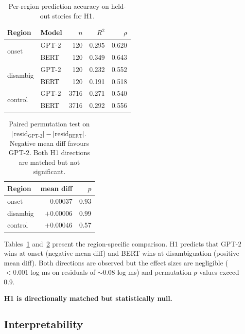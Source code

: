 \documentclass[11pt]{article}
\begin{document}
\begin{table}[t]
\centering
\small
\begin{tabular}{ll rrr}
\toprule
\textbf{Region} & \textbf{Model} & $n$ & $R^2$ & $\rho$ \\
\midrule
\multirow{2}{*}{onset}   & GPT-2 & 120 & 0.295 & 0.620 \\
                          & BERT  & 120 & 0.349 & 0.643 \\
\midrule
\multirow{2}{*}{disambig}& GPT-2 & 120 & 0.232 & 0.552 \\
                          & BERT  & 120 & 0.191 & 0.518 \\
\midrule
\multirow{2}{*}{control} & GPT-2 & 3716 & 0.271 & 0.540 \\
                          & BERT  & 3716 & 0.292 & 0.556 \\
\bottomrule
\end{tabular}
\caption{Per-region prediction accuracy on held-out stories for H1.}
\label{tab:h1}
\end{table}

\begin{table}[t]
\centering
\small
\begin{tabular}{l rr}
\toprule
\textbf{Region} & mean diff & $p$ \\
\midrule
onset   & $-0.00037$ & 0.93 \\
disambig & $+0.00006$ & 0.99 \\
control & $+0.00046$ & 0.57 \\
\bottomrule
\end{tabular}
\caption{Paired permutation test on $|\text{resid}_\text{GPT-2}| - |\text{resid}_\text{BERT}|$. Negative mean diff favours GPT-2. Both H1 directions are matched but not significant.}
\label{tab:h1perm}
\end{table}

Tables~\ref{tab:h1} and~\ref{tab:h1perm} present the region-specific comparison.
H1 predicts that GPT-2 wins at onset (negative mean diff) and BERT wins at disambiguation (positive mean diff).
Both directions are observed but the effect sizes are negligible ($< 0.001$ log-ms on residuals of ${\sim}0.08$ log-ms) and permutation $p$-values exceed 0.9.

\textbf{H1 is directionally matched but statistically null.}

\subsection{Interpretability}
\end{document}
